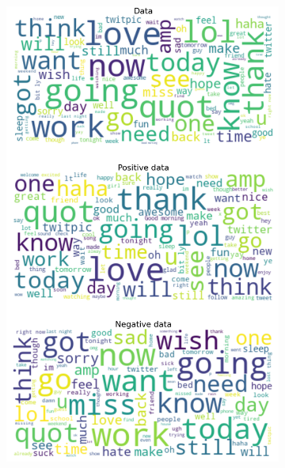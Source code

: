 \documentclass{article}
\begin{document}
\begin{itemize}
  \begin{figure}[H]
    \centering
    \captionsetup{justification=centering}
    \begin{subfigure}[b]{0.24\textwidth}
      \centering
      \includegraphics[width=\textwidth]{chapter-06/section-01-01/01/visualization/1/wordcloud.png}
    \end{subfigure}
    \begin{subfigure}[b]{0.24\textwidth}
      \centering

\end{subfigure}
\end{figure}
\end{itemize}
\end{document}
